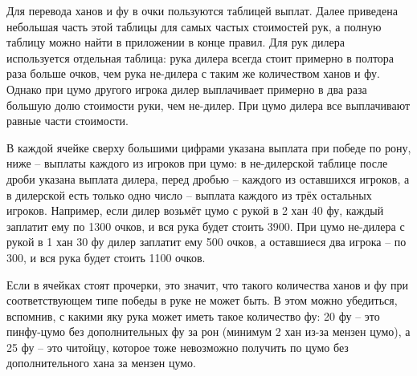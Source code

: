 Для перевода ханов и фу в очки пользуются таблицей выплат. Далее приведена небольшая часть этой таблицы для самых частых стоимостей рук, а полную таблицу можно найти в приложении в конце правил. Для рук дилера используется отдельная таблица: рука дилера всегда стоит примерно в полтора раза больше очков, чем рука не-дилера с таким же количеством ханов и фу. Однако при цумо другого игрока дилер выплачивает примерно в два раза большую долю стоимости руки, чем не-дилер. При цумо дилера все выплачивают равные части стоимости.

В каждой ячейке сверху большими цифрами указана выплата при победе по рону, ниже – выплаты каждого из игроков при цумо: в не-дилерской таблице после дроби указана выплата дилера, перед дробью – каждого из оставшихся игроков, а в дилерской есть только одно число – выплата каждого из трёх остальных игроков. Например, если дилер возьмёт цумо с рукой в 2 хан 40 фу, каждый заплатит ему по 1300 очков, и вся рука будет стоить 3900. При цумо не-дилера с рукой в 1 хан 30 фу дилер заплатит ему 500 очков, а оставшиеся два игрока – по 300, и вся рука будет стоить 1100 очков.

Если в ячейках стоят прочерки, это значит, что такого количества ханов и фу при соответствующем типе победы в руке не может быть. В этом можно убедиться, вспомнив, с какими яку рука может иметь такое количество фу: 20 фу – это пинфу-цумо без дополнительных фу за рон (минимум 2 хан из-за мензен цумо), а 25 фу – это читойцу, которое тоже невозможно получить по цумо без дополнительного хана за мензен цумо.

